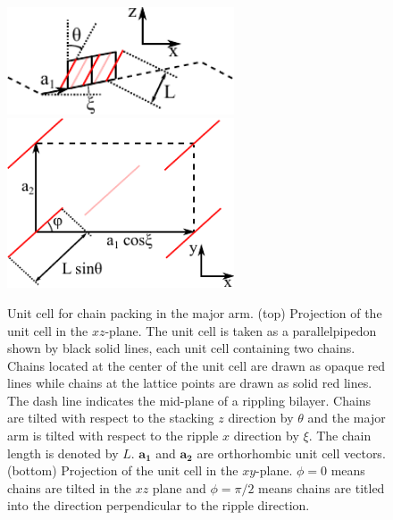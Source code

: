 \begin{figure}
  \centering
  \includegraphics[width=0.6\textwidth]{figures/ripple/unit_cell_waxs_side} \\
  \includegraphics[width=0.6\textwidth]{figures/ripple/unit_cell_waxs_top}
  \caption[Unit cell for chain packing in the major arm]
  {Unit cell for chain packing in the major arm. 
  (top) Projection of the unit cell in the $xz$-plane. The unit cell is taken
  as a parallelpipedon shown by black solid lines, each unit cell 
  containing two chains.
  Chains located at the center of the unit cell are
  drawn as opaque red lines while chains at the lattice points are 
  drawn as solid red lines. The dash line indicates
  the mid-plane of a rippling bilayer. Chains are tilted with respect to
  the stacking $z$ direction by $\theta$ and the major arm is tilted 
  with respect to the ripple $x$ direction by $\xi$. The chain length
  is denoted by $L$. $\mathbf{a_1}$ and $\mathbf{a_2}$ are orthorhombic 
  unit cell vectors.
  (bottom) Projection of the unit cell in the $xy$-plane.
  $\phi=0$ means chains are tilted in the $xz$ plane and $\phi=\pi/2$
  means chains are titled into the direction perpendicular to the 
  ripple direction.}
  \label{fig:unit_cell_waxs}
\end{figure}

